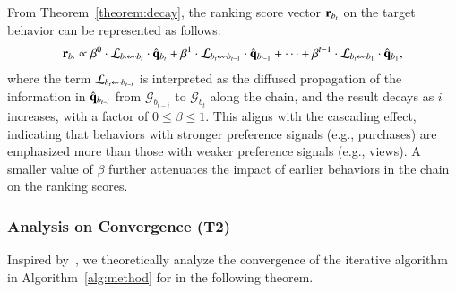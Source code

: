 From Theorem~\ref{theorem:decay}, the ranking score vector $\mathbf{r}_{b_t}$ on the target behavior can be represented as follows:
\begin{align*}
    \vect{r}_{b_t} \propto \beta^{0}\cdot\Linvprod{t}{t}\cdot\qindhat{t} + \beta^{1}\cdot\Linvprod{t}{t-1}\cdot\qindhat{t-1} + \cdots + \beta^{t-1}\cdot\Linvprod{t}{1}\cdot\qindhat{1}, 
\end{align*}
where the term $\Linvprod{t}{t-i}$ is interpreted as the diffused propagation of the information in ${\hat{\mathbf{q}}_{b_{t-i}}}$ from $\mathcal{G}_{b_{t-i}}$ to $\mathcal{G}_{b_{t}}$ along the chain, and the result decays as $i$ increases, with a factor of $0\leq \beta \leq 1$.
%
This aligns with the cascading effect, indicating that behaviors with stronger preference signals (e.g., purchases) are emphasized more than those with weaker preference signals (e.g., views).
A smaller value of $\beta$ further attenuates the impact of earlier behaviors in the chain on the ranking scores. 

\subsubsection{Analysis on Convergence (T2)}
\label{sec:proposed:analysis:convergence}
Inspired by~\cite{HeHGKW17}, we theoretically analyze the convergence of the iterative algorithm in Algorithm~\ref{alg:method} for \method in the following theorem.

